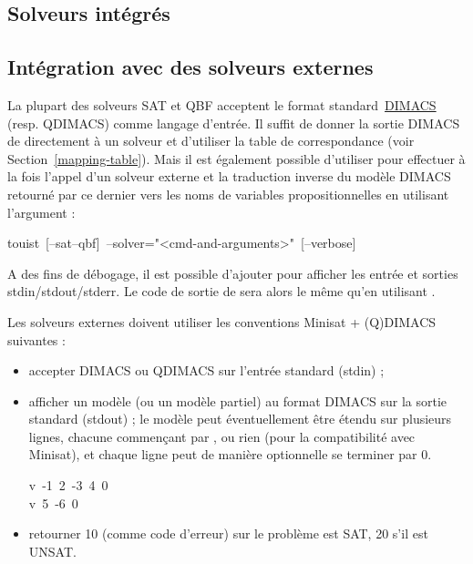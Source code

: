 %
%
\subsection{Solveurs intégrés}


%
%
\subsection{Intégration avec des solveurs externes}

\noindent La plupart des solveurs SAT et QBF acceptent le format standard~\href{http://www.satcompetition.org/2009/format-benchmarks2009.html}{DIMACS} (resp.
QDIMACS) comme langage d'entrée. Il suffit de donner la sortie DIMACS de \touist directement à un solveur et d'utiliser la table de correspondance (voir Section~\ref{mapping-table}).
Mais il est également possible d'utiliser \touist pour effectuer à la fois l'appel d'un solveur externe et la traduction inverse du modèle DIMACS retourné par ce dernier vers les noms de variables propositionnelles en utilisant l'argument :%
\begin{footnotesize}
\begin{mdpre}%
\noindent{}touist~{}[--sat\textbar{}--qbf]~--solver="\textless{}cmd-and-arguments\textgreater{}"~{}[--verbose]%
\end{mdpre}
\end{footnotesize}
\noindent A des fins de débogage, il est possible d'ajouter  pour afficher les entrée et sorties stdin/stdout/stderr.
Le code de sortie de \touist sera alors le même qu'en utilisant .

Les solveurs externes doivent utiliser les conventions Minisat + (Q)DIMACS suivantes :
\begin{itemize}
    \item accepter DIMACS ou QDIMACS sur l'entrée standard (stdin) ;
    \item afficher un modèle (ou un modèle partiel) au format DIMACS sur la sortie standard (stdout) ; le modèle peut éventuellement être étendu sur plusieurs lignes, chacune commençant par ,  ou rien (pour la compatibilité avec Minisat), et chaque ligne peut de manière optionnelle se terminer par 0.
\begin{mdpre}%
\noindent{}v~-1~2~-3~4~0\\
v~5~-6~0%
\end{mdpre}

\item retourner 10 (comme code d'erreur) sur le problème est SAT, 20 s'il est UNSAT.%
\end{itemize}%

